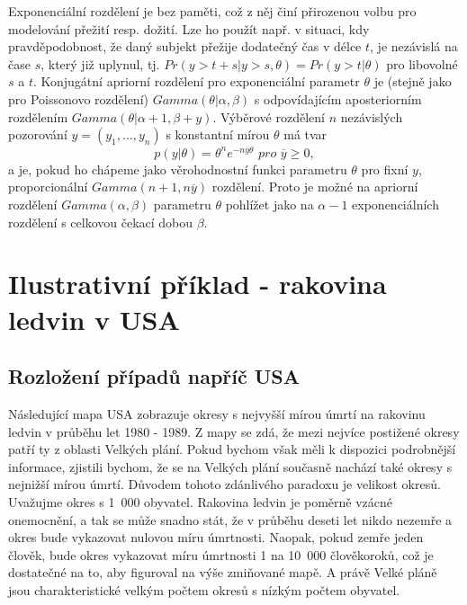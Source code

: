 Exponenciální rozdělení je bez paměti, což z něj činí přirozenou volbu pro modelování přežití resp. dožití. Lze ho použít např. v situaci, kdy pravděpodobnost, že daný subjekt přežije dodatečný čas v délce $t$, je nezávislá na čase $s$, který již uplynul, tj. $Pr(y > t + s | y > s, \theta) = Pr(y > t | \theta)$ pro libovolné $s$ a $t$. Konjugátní apriorní rozdělení pro exponenciální parametr $\theta$ je (stejně jako pro Poissonovo rozdělení) $\textit{Gamma}(\theta | \alpha, \beta)$ s odpovídajícím aposteriorním rozdělením $\textit{Gamma}(\theta | \alpha + 1, \beta + y)$. Výběrové rozdělení $n$ nezávislých pozorování $y = (y_1, ..., y_n)$ s konstantní mírou $\theta$ má tvar
\begin{equation}
p(y | \theta) = \theta^n e^{-n \overline{y} \theta} \textit{ pro } \overline{y} \ge 0,
\end{equation}
a je, pokud ho chápeme jako věrohodnostní funkci parametru $\theta$ pro fixní $y$, proporcionální $Gamma(n + 1, n \overline{y})$ rozdělení. Proto je možné na apriorní rozdělení $Gamma(\alpha, \beta)$ parametru $\theta$ pohlížet jako na $\alpha - 1$ exponenciálních rozdělení s celkovou čekací dobou $\beta$.

\section{Ilustrativní příklad - rakovina ledvin v USA}

\subsection{Rozložení případů napříč USA}

Následující mapa USA zobrazuje okresy s nejvyšší mírou úmrtí na rakovinu ledvin v průběhu let 1980 - 1989. Z mapy se zdá, že mezi nejvíce postižené okresy patří ty z oblasti Velkých plání. Pokud bychom však měli k dispozici podrobnější informace, zjistili bychom, že se na Velkých plání současně nachází také okresy s nejnižší mírou úmrtí. Důvodem tohoto zdánlivého paradoxu je velikost okresů. Uvažujme okres s 1~000 obyvatel. Rakovina ledvin je poměrně vzácné onemocnění, a tak se může snadno stát, že v průběhu deseti let nikdo nezemře a okres bude vykazovat nulovou míru úmrtnosti. Naopak, pokud zemře jeden člověk, bude okres vykazovat míru úmrtnosti 1 na 10~000 člověkoroků, což je dostatečné na to, aby figuroval na výše zmiňované mapě. A právě Velké pláně jsou charakteristické velkým počtem okresů s nízkým počtem obyvatel.

